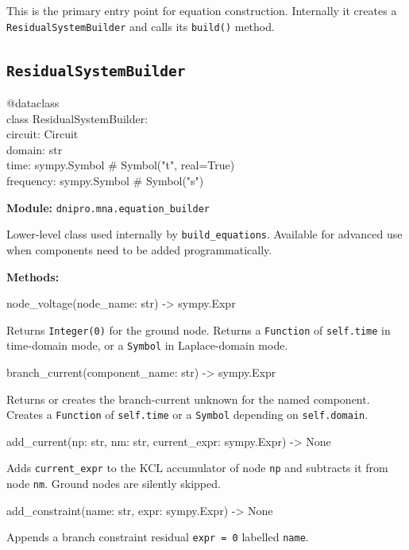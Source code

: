 \documentclass[11pt,a4paper]{article}
\newcommand{\code}[1]{\texttt{#1}}
\newenvironment{apisig}{%
  \begin{trivlist}\item\relax\ttfamily\small
}{%
  \end{trivlist}
}
\begin{document}
This is the primary entry point for equation construction.
Internally it creates a \code{ResidualSystemBuilder} and calls its \code{build()} method.

\subsection{\texttt{ResidualSystemBuilder}}
\label{api:builder}

\begin{apisig}
@dataclass \\
class ResidualSystemBuilder: \\
\quad circuit: Circuit \\
\quad domain: str \\
\quad time: sympy.Symbol        \# Symbol("t", real=True) \\
\quad frequency: sympy.Symbol   \# Symbol("s")
\end{apisig}

\textbf{Module:} \code{dnipro.mna.equation\_builder}

Lower-level class used internally by \code{build\_equations}.
Available for advanced use when components need to be added programmatically.

\textbf{Methods:}

\begin{apisig}
node\_voltage(node\_name: str) -> sympy.Expr
\end{apisig}
Returns \code{Integer(0)} for the ground node.
Returns a \code{Function} of \code{self.time} in time-domain mode,
or a \code{Symbol} in Laplace-domain mode.

\begin{apisig}
branch\_current(component\_name: str) -> sympy.Expr
\end{apisig}
Returns or creates the branch-current unknown for the named component.
Creates a \code{Function} of \code{self.time} or a \code{Symbol} depending
on \code{self.domain}.

\begin{apisig}
add\_current(np: str, nm: str, current\_expr: sympy.Expr) -> None
\end{apisig}
Adds \code{current\_expr} to the KCL accumulator of node \code{np}
and subtracts it from node \code{nm}.
Ground nodes are silently skipped.

\begin{apisig}
add\_constraint(name: str, expr: sympy.Expr) -> None
\end{apisig}
Appends a branch constraint residual \code{expr = 0} labelled \code{name}.
\end{document}
